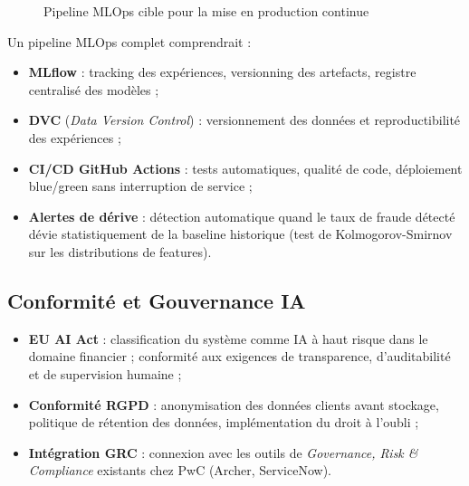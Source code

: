 \documentclass[12pt,a4paper,twoside]{report}
\theoremstyle{definition}
\begin{document}
\begin{figure}[H]
\centering
{}
\caption{Pipeline MLOps cible pour la mise en production continue}
\label{fig:mlops}
\end{figure}

Un pipeline MLOps complet comprendrait :
\begin{itemize}
  \item \textbf{MLflow} : tracking des expériences, versionning des artefacts,
    registre centralisé des modèles ;
  \item \textbf{DVC} (\textit{Data Version Control}) : versionnement des données
    et reproductibilité des expériences ;
  \item \textbf{CI/CD GitHub Actions} : tests automatiques, qualité de code,
    déploiement blue/green sans interruption de service ;
  \item \textbf{Alertes de dérive} : détection automatique quand le taux de
    fraude détecté dévie statistiquement de la baseline historique
    (test de Kolmogorov-Smirnov sur les distributions de features).
\end{itemize}

\subsection{Conformité et Gouvernance IA}

\begin{itemize}
  \item \textbf{EU AI Act} : classification du système comme IA à haut risque
    dans le domaine financier ; conformité aux exigences de transparence,
    d'auditabilité et de supervision humaine ;
  \item \textbf{Conformité RGPD} : anonymisation des données clients avant
    stockage, politique de rétention des données, implémentation du droit
    à l'oubli ;
  \item \textbf{Intégration GRC} : connexion avec les outils de
    \textit{Governance, Risk \& Compliance} existants chez PwC
    (Archer, ServiceNow).
\end{itemize}
\end{document}
